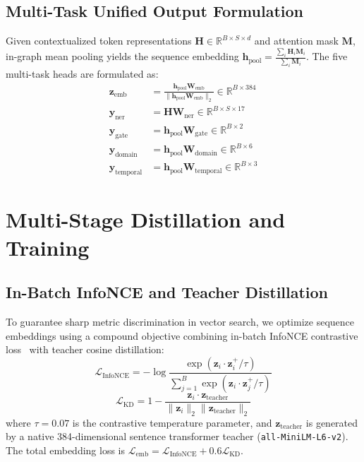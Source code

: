 \documentclass[11pt,a4paper]{article}
\begin{document}
\subsection{Multi-Task Unified Output Formulation}
Given contextualized token representations $\mathbf{H} \in \mathbb{R}^{B \times S \times d}$ and attention mask $\mathbf{M}$, in-graph mean pooling yields the sequence embedding $\mathbf{h}_{\text{pool}} = \frac{\sum_i \mathbf{H}_i \mathbf{M}_i}{\sum_i \mathbf{M}_i}$. The five multi-task heads are formulated as:
\begin{align}
    \mathbf{z}_{\text{emb}} &= \frac{\mathbf{h}_{\text{pool}} \mathbf{W}_{\text{emb}}}{\|\mathbf{h}_{\text{pool}} \mathbf{W}_{\text{emb}}\|_2} \in \mathbb{R}^{B \times 384} \\
    \mathbf{y}_{\text{ner}} &= \mathbf{H} \mathbf{W}_{\text{ner}} \in \mathbb{R}^{B \times S \times 17} \\
    \mathbf{y}_{\text{gate}} &= \mathbf{h}_{\text{pool}} \mathbf{W}_{\text{gate}} \in \mathbb{R}^{B \times 2} \\
    \mathbf{y}_{\text{domain}} &= \mathbf{h}_{\text{pool}} \mathbf{W}_{\text{domain}} \in \mathbb{R}^{B \times 6} \\
    \mathbf{y}_{\text{temporal}} &= \mathbf{h}_{\text{pool}} \mathbf{W}_{\text{temporal}} \in \mathbb{R}^{B \times 3}
\end{align}

\section{Multi-Stage Distillation and Training}

\subsection{In-Batch InfoNCE and Teacher Distillation}
To guarantee sharp metric discrimination in vector search, we optimize sequence embeddings using a compound objective combining in-batch InfoNCE contrastive loss~\cite{oord2018representation} with teacher cosine distillation:
\begin{equation}
    \mathcal{L}_{\text{InfoNCE}} = -\log \frac{\exp(\mathbf{z}_i \cdot \mathbf{z}_i^+ / \tau)}{\sum_{j=1}^B \exp(\mathbf{z}_i \cdot \mathbf{z}_j^+ / \tau)}
\end{equation}
\begin{equation}
    \mathcal{L}_{\text{KD}} = 1 - \frac{\mathbf{z}_i \cdot \mathbf{z}_{\text{teacher}}}{\|\mathbf{z}_i\|_2 \|\mathbf{z}_{\text{teacher}}\|_2}
\end{equation}
where $\tau=0.07$ is the contrastive temperature parameter, and $\mathbf{z}_{\text{teacher}}$ is generated by a native 384-dimensional sentence transformer teacher (\texttt{all-MiniLM-L6-v2}). The total embedding loss is $\mathcal{L}_{\text{emb}} = \mathcal{L}_{\text{InfoNCE}} + 0.6 \mathcal{L}_{\text{KD}}$.
\end{document}
